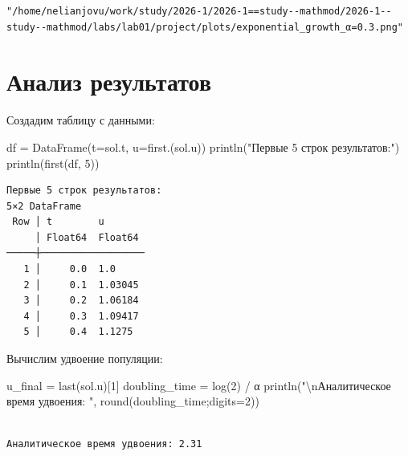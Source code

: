 \documentclass[
  12pt,
  a4paper,
  DIV=11,
  numbers=noendperiod]{scrreprt}
\newenvironment{Shaded}{\begin{snugshade}}{\end{snugshade}}
\newcommand{\FloatTok}[1]{\textcolor[rgb]{0.68,0.00,0.00}{#1}}
\newcommand{\FunctionTok}[1]{\textcolor[rgb]{0.28,0.35,0.67}{#1}}
\newcommand{\NormalTok}[1]{\textcolor[rgb]{0.00,0.23,0.31}{#1}}
\newcommand{\OperatorTok}[1]{\textcolor[rgb]{0.37,0.37,0.37}{#1}}
\newcommand{\SpecialCharTok}[1]{\textcolor[rgb]{0.37,0.37,0.37}{#1}}
\newcommand{\StringTok}[1]{\textcolor[rgb]{0.13,0.47,0.30}{#1}}
\begin{document}
\begin{verbatim}
"/home/nelianjovu/work/study/2026-1/2026-1==study--mathmod/2026-1--study--mathmod/labs/lab01/project/plots/exponential_growth_α=0.3.png"
\end{verbatim}

\section{Анализ
результатов}\label{ux430ux43dux430ux43bux438ux437-ux440ux435ux437ux443ux43bux44cux442ux430ux442ux43eux432}

Создадим таблицу с данными:

\begin{Shaded}
\begin{Highlighting}[]
\NormalTok{df }\OperatorTok{=} \FunctionTok{DataFrame}\NormalTok{(t}\OperatorTok{=}\NormalTok{sol.t, u}\OperatorTok{=}\FunctionTok{first}\NormalTok{.(sol.u))}
\FunctionTok{println}\NormalTok{(}\StringTok{"Первые 5 строк результатов:"}\NormalTok{)}
\FunctionTok{println}\NormalTok{(}\FunctionTok{first}\NormalTok{(df, }\FloatTok{5}\NormalTok{))}
\end{Highlighting}
\end{Shaded}

\begin{verbatim}
Первые 5 строк результатов:
5×2 DataFrame
 Row │ t        u       
     │ Float64  Float64 
─────┼──────────────────
   1 │     0.0  1.0
   2 │     0.1  1.03045
   3 │     0.2  1.06184
   4 │     0.3  1.09417
   5 │     0.4  1.1275
\end{verbatim}

Вычислим удвоение популяции:

\begin{Shaded}
\begin{Highlighting}[]
\NormalTok{u\_final }\OperatorTok{=} \FunctionTok{last}\NormalTok{(sol.u)[}\FloatTok{1}\NormalTok{]}
\NormalTok{doubling\_time }\OperatorTok{=} \FunctionTok{log}\NormalTok{(}\FloatTok{2}\NormalTok{) }\OperatorTok{/}\NormalTok{ α}
\FunctionTok{println}\NormalTok{(}\StringTok{"}\SpecialCharTok{\textbackslash{}n}\StringTok{Аналитическое время удвоения: "}\NormalTok{, }\FunctionTok{round}\NormalTok{(doubling\_time;digits}\OperatorTok{=}\FloatTok{2}\NormalTok{))}
\end{Highlighting}
\end{Shaded}

\begin{verbatim}

Аналитическое время удвоения: 2.31
\end{verbatim}
\end{document}
